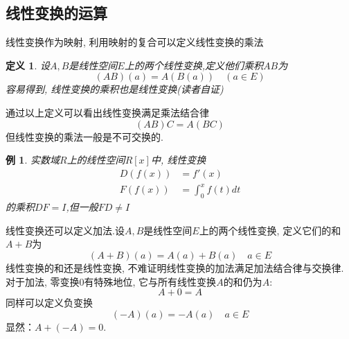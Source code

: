 \documentclass[a4paper,11pt]{book}
\newtheorem{definition}{\hspace{2em}定义}[section]
\newtheorem{example}{例}[section]
\begin{document}
\subsection*{线性变换的运算}
线性变换作为映射, 利用映射的复合可以定义线性变换的乘法
\begin{definition}
  设$A,B$是线性空间$E$上的两个线性变换,定义他们乘积$AB$为
  \begin{equation*}
    (AB)(a)=A(B(a))\quad (a\in E)
  \end{equation*}
  容易得到, 线性变换的乘积也是线性变换(读者自证)
\end{definition}
通过以上定义可以看出线性变换满足乘法结合律
\begin{equation*}
  (AB)C=A(BC)
\end{equation*}
但线性变换的乘法一般是不可交换的.
\begin{example}
  实数域$R$上的线性空间$R[x]$中, 线性变换
  \begin{equation*}
    \begin{split}
       D(f(x))&=f'(x)\\
       F(f(x))&=\int_{0}^{x}f(t)dt
    \end{split}
  \end{equation*}
  的乘积$DF=I$,但一般$FD\neq I$
\end{example}
线性变换还可以定义加法.设$A,B$是线性空间$E$上的两个线性变换, 定义它们的和$A+B$为
\begin{equation*}
  (A+B)(a)=A(a)+B(a)\quad a\in E
\end{equation*}
线性变换的和还是线性变换, 不难证明线性变换的加法满足加法结合律与交换律. 对于加法, 零变换$0$有特殊地位, 它与所有线性变换$A$的和仍为$A$:
\begin{equation*}
  A+0=A
\end{equation*}
同样可以定义负变换
\begin{equation*}
  (-A)(a)=-A(a)\quad a\in E
\end{equation*}
显然：$A+(-A)=0$.
\end{document}
